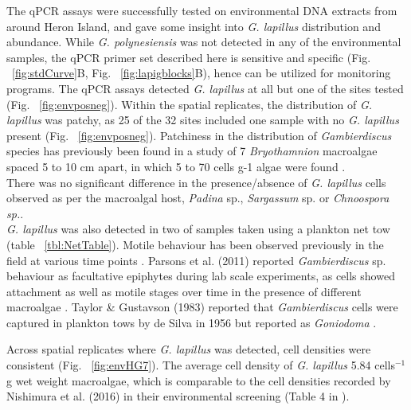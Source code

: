 \documentclass[12pt]{article}
\begin{document}
The qPCR assays were successfully tested on environmental DNA extracts from around Heron Island, and gave some insight into \emph{G. lapillus} distribution and abundance. While \emph{G. polynesiensis} was not detected in any of the environmental samples, the qPCR primer set described here is sensitive and specific (Fig. ~\ref{fig:stdCurve}B, Fig. ~\ref{fig:lapigblocks}B), hence can be utilized for monitoring programs.
The qPCR assays detected \emph{G. lapillus} at all but one of the sites tested (Fig. ~\ref{fig:envposneg}). Within the spatial replicates, the distribution of \emph{G. lapillus} was patchy, as 25 of the 32 sites included one sample with no \textit{G. lapillus} present (Fig. ~\ref{fig:envposneg}). Patchiness in the distribution of \textit{Gambierdiscus} species has previously been found in a study of 7 \emph{Bryothamnion} macroalgae spaced 5 to 10 cm apart, in which 5 to 70 cells g-1 algae were found \cite{taylor1986underwater}.\\
There was no significant difference in the presence/absence of \emph{G. lapillus} cells observed as per the macroalgal host, \emph{Padina} sp., \emph{Sargassum} sp. or \emph{Chnoospora sp.}.  \\
\emph{G. lapillus} was also detected in two of samples taken using a plankton net tow (table ~\ref{tbl:NetTable}). Motile behaviour has been observed previously in the field at various time points \cite{yasumoto1977finding,bomber1987ecology}. Parsons et al. (2011) reported \emph{Gambierdiscus} sp. behaviour as facultative epiphytes during lab scale experiments, as cells showed attachment as well as motile stages over time in the presence of different macroalgae \cite{parsons2011examination}. Taylor \& Gustavson (1983) reported that \emph{Gambierdiscus} cells were captured in plankton tows by de Silva in 1956 but reported as \emph{Goniodoma} \cite{taylor1986underwater}.

Across spatial replicates where \emph{G. lapillus} was detected, cell densities were consistent (Fig. ~\ref{fig:envHG7}). The average cell density of \emph{G. lapillus} 5.84 cells$^{-1}$g wet weight macroalgae, which is comparable to the cell densities recorded by Nishimura et al. (2016) in their environmental screening (Table 4 in \cite{nishimura2016quantitative}).\\
\end{document}
